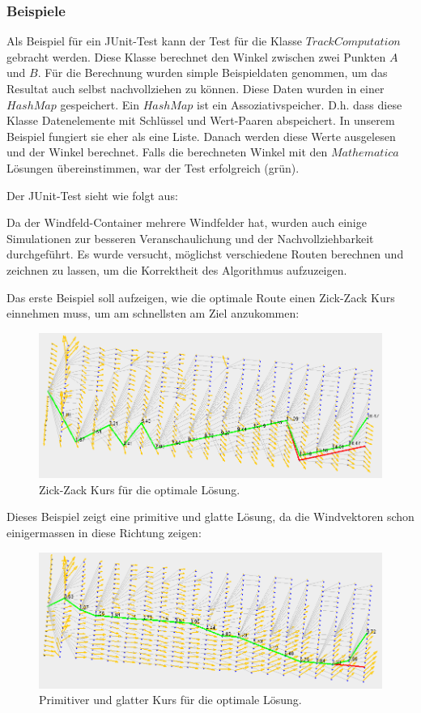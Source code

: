 \subsubsection{Beispiele}
Als Beispiel für ein JUnit-Test kann der Test für die Klasse $TrackComputation$ gebracht werden. 
Diese Klasse berechnet den Winkel zwischen zwei Punkten $A$ und $B$. Für die Berechnung
wurden simple Beispieldaten genommen, um das Resultat auch selbst nachvollziehen zu können.
Diese Daten wurden in einer $HashMap$ gespeichert. Ein $HashMap$ ist ein Assoziativspeicher. 
D.h. dass diese Klasse Datenelemente mit Schlüssel und Wert-Paaren abspeichert. In unserem
Beispiel fungiert sie eher als eine Liste. Danach werden diese Werte ausgelesen und der 
Winkel berechnet. Falls die berechneten Winkel mit den $Mathematica$ Lösungen übereinstimmen,
war der Test erfolgreich (grün).

Der JUnit-Test sieht wie folgt aus:



Da der Windfeld-Container mehrere Windfelder hat, wurden auch einige Simulationen 
zur besseren Veranschaulichung und der Nachvollziehbarkeit durchgeführt. Es wurde versucht,
möglichst verschiedene Routen berechnen und zeichnen zu lassen, um die Korrektheit des
Algorithmus aufzuzeigen. 

Das erste Beispiel soll aufzeigen, wie die optimale Route einen Zick-Zack Kurs einnehmen muss,
um am schnellsten am Ziel anzukommen:

\begin{figure}[h!]
\centering
\includegraphics[width=0.8\linewidth]{img/gridNet_1}
\caption{Zick-Zack Kurs für die optimale Lösung.}
\label{gridnet1}
\end{figure}

Dieses Beispiel zeigt eine primitive und glatte Lösung, da die Windvektoren schon einigermassen in diese Richtung zeigen:

\begin{figure}[h!]
\centering
\includegraphics[width=0.8\linewidth]{img/gridNet_2}
\caption{Primitiver und glatter Kurs für die optimale Lösung.}
\label{gridnet1}
\end{figure}

